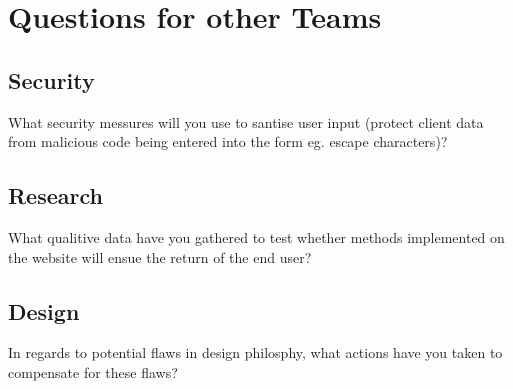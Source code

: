 \documentclass[letterpaper,12pt]{article}
\begin{document}
\section{Questions for other Teams}

\subsection{Security}

What security messures will you use to santise user input (protect client data from malicious code being entered into the form eg. escape characters)?

\subsection{Research}

What qualitive data have you gathered to test whether methods implemented on the website will ensue the return of the end user?

\subsection {Design}

In regards to potential flaws in design philosphy, what actions have you taken to compensate for these flaws?

\appendix
\printindex
{}
\printglossaries

\end{document}

